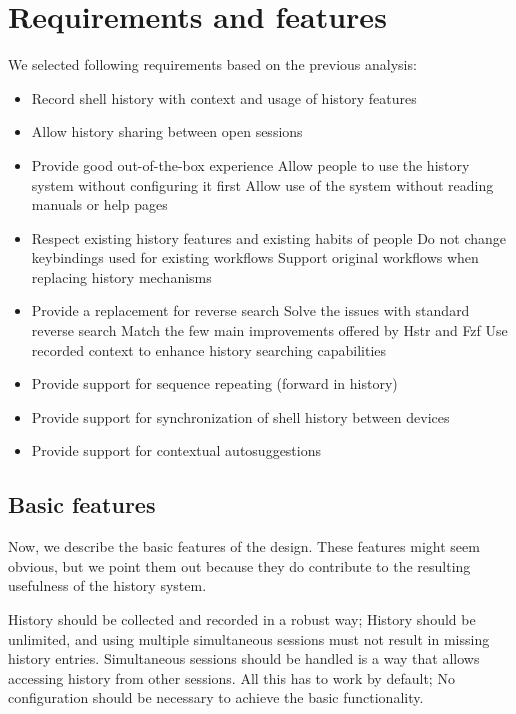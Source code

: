 \newpage
\section{Requirements and features}


We selected following requirements based on the previous analysis:

\begin{itemize}
\item Record shell history with context and usage of history features
\item Allow history sharing between open sessions
\item Provide good out-of-the-box experience
\subitem Allow people to use the history system without configuring it first
\subitem Allow use of the system without reading manuals or help pages
\item Respect existing history features and existing habits of people
\subitem Do not change keybindings used for existing workflows
\subitem Support original workflows when replacing history mechanisms
\item Provide a replacement for reverse search
\subitem Solve the issues with standard reverse search
\subitem Match the few main improvements offered by Hstr and Fzf
\subitem Use recorded context to enhance history searching capabilities
\item Provide support for sequence repeating (forward in history)
\item Provide support for synchronization of shell history between devices
\item Provide support for contextual autosuggestions
\end{itemize}



\subsection{Basic features}

Now, we describe the basic features of the design. These features might seem obvious, but we point them out because they do contribute to the resulting usefulness of the history system.

History should be collected and recorded in a robust way; History should be unlimited, and using multiple simultaneous sessions must not result in missing history entries. 
Simultaneous sessions should be handled is a way that allows accessing history from other sessions.
All this has to work by default; No configuration should be necessary to achieve the basic functionality. 

